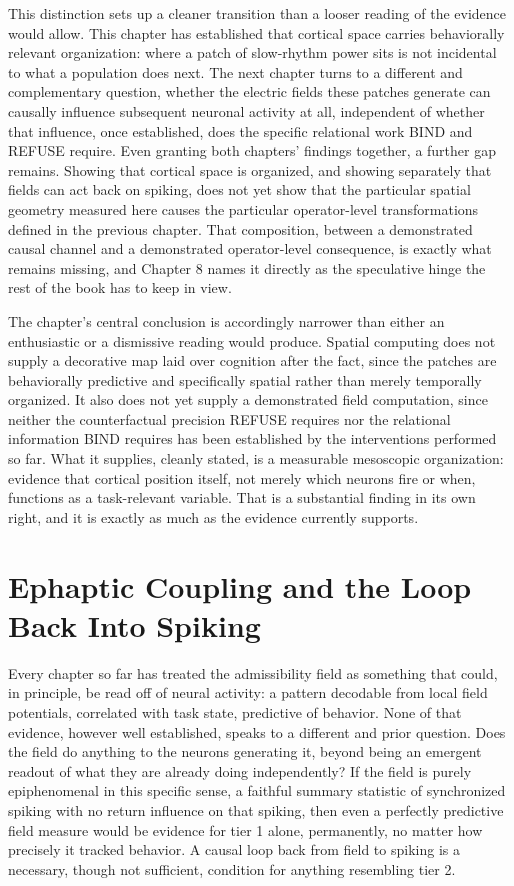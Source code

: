 \documentclass[11pt]{book}
\begin{document}
This distinction sets up a cleaner transition than a looser reading of the evidence would allow. This chapter has established that cortical space carries behaviorally relevant organization: where a patch of slow-rhythm power sits is not incidental to what a population does next. The next chapter turns to a different and complementary question, whether the electric fields these patches generate can causally influence subsequent neuronal activity at all, independent of whether that influence, once established, does the specific relational work BIND and REFUSE require. Even granting both chapters' findings together, a further gap remains. Showing that cortical space is organized, and showing separately that fields can act back on spiking, does not yet show that the particular spatial geometry measured here causes the particular operator-level transformations defined in the previous chapter. That composition, between a demonstrated causal channel and a demonstrated operator-level consequence, is exactly what remains missing, and Chapter 8 names it directly as the speculative hinge the rest of the book has to keep in view.

The chapter's central conclusion is accordingly narrower than either an enthusiastic or a dismissive reading would produce. Spatial computing does not supply a decorative map laid over cognition after the fact, since the patches are behaviorally predictive and specifically spatial rather than merely temporally organized. It also does not yet supply a demonstrated field computation, since neither the counterfactual precision REFUSE requires nor the relational information BIND requires has been established by the interventions performed so far. What it supplies, cleanly stated, is a measurable mesoscopic organization: evidence that cortical position itself, not merely which neurons fire or when, functions as a task-relevant variable. That is a substantial finding in its own right, and it is exactly as much as the evidence currently supports.

\chapter{Ephaptic Coupling and the Loop Back Into Spiking}

Every chapter so far has treated the admissibility field as something that could, in principle, be read off of neural activity: a pattern decodable from local field potentials, correlated with task state, predictive of behavior. None of that evidence, however well established, speaks to a different and prior question. Does the field do anything to the neurons generating it, beyond being an emergent readout of what they are already doing independently? If the field is purely epiphenomenal in this specific sense, a faithful summary statistic of synchronized spiking with no return influence on that spiking, then even a perfectly predictive field measure would be evidence for tier 1 alone, permanently, no matter how precisely it tracked behavior. A causal loop back from field to spiking is a necessary, though not sufficient, condition for anything resembling tier 2.
\end{document}

